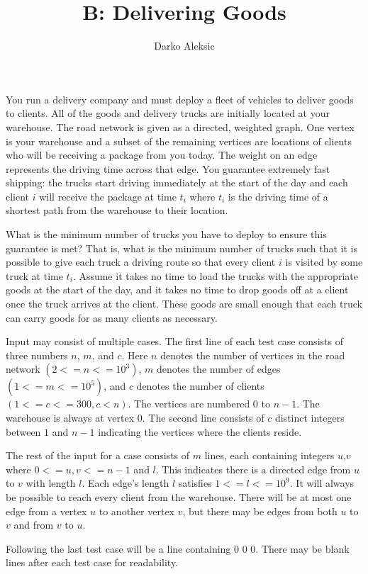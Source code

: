 \documentclass{article}
\title{B: Delivering Goods}
\author{Darko Aleksic}
\begin{document}
\begin{problemDescription}
You run a delivery company and must deploy a fleet of vehicles to deliver goods 
to clients. All of the goods and delivery trucks are initially located at your 
warehouse.  The road network is given as a directed, weighted graph. One vertex 
is your warehouse and a subset of the remaining vertices are locations of clients 
who will be receiving a package from you today. The weight on an edge represents 
the driving time across that edge.  You guarantee extremely fast shipping: the 
trucks start driving immediately at the start of the day and each client $i$ will 
receive the package at time $t_{i}$ where $t_{i}$ is the driving time of a shortest 
path from the warehouse to their location.

What is the minimum number of trucks you have to deploy to ensure this guarantee 
is met? That is, what is the minimum number of trucks such that it is possible to 
give each truck a driving route so that every client $i$ is visited by some truck 
at time $t_{i}$. Assume it takes no time to load the trucks with the appropriate 
goods at the start of the day, and it takes no time to drop goods off at a client 
once the truck arrives at the client.  These goods are small enough that each truck 
can carry goods for as many clients as necessary.
\end{problemDescription}

\begin{inputDescription}
Input may consist of multiple cases.  The first line of each test case consists of 
three numbers $n$, $m$, and $c$.  Here $n$ denotes the number of vertices in the 
road network $(2 <= n <= 10^{3})$, $m$ denotes the number of edges
$(1 <=  m <= 10^{5})$, and $c$ denotes the number of clients $(1 <= c <= 300, c < n)$.
The vertices are numbered $0$ to $n - 1$. The warehouse is always at vertex $0$. 
The second line consists of $c$ distinct integers between $1$ and $n - 1$
indicating the vertices where the clients reside.

The rest of the input for a case consists of $m$ lines, each containing integers 
$u$,$v$ where $0 <= u,v <= n-1$ and $l$.
This indicates there is a directed edge from $u$ to $v$ with length $l$. Each 
edge's length $l$ satisfies $1 <= l  <= 10^{9}$.
It will always be possible to reach every client from the warehouse.
There will be at most one edge from a vertex $u$ to another vertex $v$, but there
may be edges from both $u$ to $v$ and from $v$ to $u$.

Following the last test case will be a line containing 0 0 0.  There may be blank lines
after each test case for readability.
\end{inputDescription}
\end{document}
